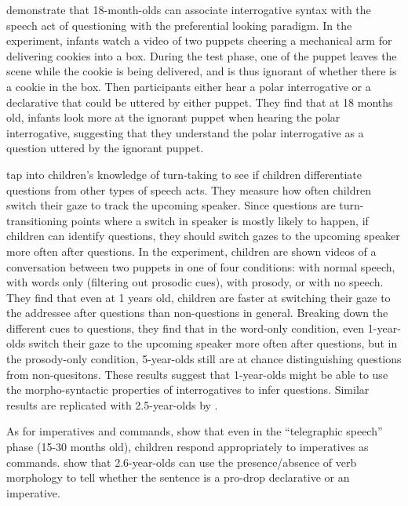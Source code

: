 \textcite{marshmallowqueen} demonstrate that 18-month-olds can associate interrogative syntax with the speech act of questioning with the preferential looking paradigm. In the experiment, infants watch a video of two puppets cheering a mechanical arm for delivering cookies into a box. During the test phase, one of the puppet leaves the scene while the cookie is being delivered, and is thus ignorant of whether there is a cookie in the box. Then participants either hear a polar interrogative  or a declarative  that could be uttered by either puppet. They find that at 18 months old, infants look more at the ignorant puppet when hearing the polar interrogative, suggesting that they understand the polar interrogative as a question uttered by the ignorant puppet.

\textcite{casillas2017turn} tap into children's knowledge of turn-taking to see if children differentiate questions from other types of speech acts. They measure how often children switch their gaze to track the upcoming speaker. Since questions are turn-transitioning points where a switch in speaker is mostly likely to happen, if children can identify questions, they should switch gazes to the upcoming speaker more often after questions. In the experiment, children are shown videos of a conversation between two puppets in one of four conditions: with normal speech, with words only (filtering out prosodic cues), with prosody, or with no speech. They find that even at 1 years old, children are faster at switching their gaze to the addressee after questions than non-questions in general. Breaking down the different cues to questions, they find that in the word-only condition, even 1-year-olds switch their gaze to the upcoming speaker more often after questions, but in the prosody-only condition, 5-year-olds still are at chance distinguishing questions from non-quesitons. These results suggest that 1-year-olds might be able to use the morpho-syntactic properties of interrogatives to infer questions. Similar results are replicated with 2.5-year-olds by \textcite{lammertink2015turn}.


As for imperatives and commands, \textcite{} show that even in the ``telegraphic speech'' phase (15-30 months old), children respond appropriately to imperatives as commands. \textcite{orfitellihyams2012subj} show that 2.6-year-olds can use the presence/absence of verb morphology to tell whether the sentence is a pro-drop declarative or an imperative. 


